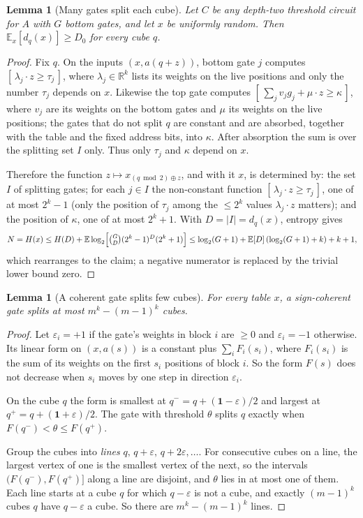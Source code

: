 \documentclass[11pt]{article}
\newtheorem{lemma}[theorem]{Lemma}
\newcommand{\ind}[1]{[\,#1\,]}
\begin{document}
\begin{lemma}[Many gates split each cube]\label{lem:entropy}
Let $C$ be any depth-two threshold circuit for $A$ with $G$ bottom gates, and
let $x$ be uniformly random. Then $\mathbb E_x[d_q(x)]\ge D_0$ for every cube
$q$.
\end{lemma}
\begin{proof}
Fix $q$. On the inputs $(x,a(q+z))$, bottom gate $j$ computes
$\ind{\lambda_j\cdot z\ge\tau_j}$, where $\lambda_j\in\mathbb R^k$ lists its
weights on the live positions and only the number $\tau_j$ depends on $x$.
Likewise the top gate computes
$\ind{\sum_jv_jg_j+\mu\cdot z\ge\kappa}$, where $v_j$ are its weights on the
bottom gates and $\mu$ its weights on the live positions; the gates that
do not split $q$ are constant and are absorbed, together with the table and
the fixed address bits, into $\kappa$. After absorption the sum is over the splitting set $I$ only.
Thus only $\tau_j$ and $\kappa$ depend on $x$.

Therefore the function $z\mapsto x_{(q\bmod2)\oplus z}$, and with it $x$, is
determined by: the set $I$ of splitting gates; for each $j\in I$ the
non-constant function $\ind{\lambda_j\cdot z\ge\tau_j}$, one of at most $2^k-1$
(only the position of $\tau_j$ among the $\le2^k$ values $\lambda_j\cdot z$
matters); and the position of $\kappa$, one of at most $2^k+1$. With
$D=|I|=d_q(x)$, entropy gives
$$
N=H(x)\le H(D)+\mathbb E\log_2\Bigl[\tbinom GD(2^k-1)^D(2^k+1)\Bigr]
\le\log_2(G+1)+\mathbb E[D]\,(\log_2(G+1)+k)+k+1,
$$
which rearranges to the claim; a negative numerator is replaced by the
trivial lower bound zero.
\end{proof}

\begin{lemma}[A coherent gate splits few cubes]\label{lem:diag}
For every table $x$, a sign-coherent gate splits at most $m^k-(m-1)^k$ cubes.
\end{lemma}
\begin{proof}
Let $\varepsilon_i=+1$ if the gate's weights in block $i$ are $\ge0$ and
$\varepsilon_i=-1$ otherwise. Its linear form on $(x,a(s))$ is a constant plus
$\sum_iF_i(s_i)$, where $F_i(s_i)$ is the sum of its weights on the first
$s_i$ positions of block $i$. So the form $F(s)$ does not decrease when
$s_i$ moves by one step in direction $\varepsilon_i$.

On the cube $q$ the form is smallest at $q^-=q+(\mathbf1-\varepsilon)/2$ and
largest at $q^+=q+(\mathbf1+\varepsilon)/2$. The gate with threshold $\theta$
splits $q$ exactly when $F(q^-)<\theta\le F(q^+)$.

Group the cubes into \emph{lines} $q,\,q+\varepsilon,\,q+2\varepsilon,\dots$.
For consecutive cubes on a line, the largest vertex of one is the smallest
vertex of the next, so the intervals $(F(q^-),F(q^+)]$ along a line are
disjoint, and $\theta$ lies in at most one of them. Each line starts at a cube
$q$ for which $q-\varepsilon$ is not a cube, and exactly $(m-1)^k$ cubes $q$
have $q-\varepsilon$ a cube. So there are $m^k-(m-1)^k$ lines.
\end{proof}
\end{document}
